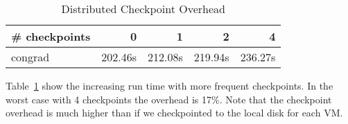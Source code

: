 \begin{table} [htb]
\begin{center}
\begin{tabular}{|l|r|r|r|r|}  \hline
\# checkpoints &      0  &       1 &   2    & 4 \\ \hline\hline
congrad        & 202.46s &  212.08s &  219.94s & 236.27s \\ \hline
\end{tabular}
\end{center}
\caption{Distributed Checkpoint Overhead}
\label{tab:dcheckpointoverhead}
\end{table}

Table~\ref{tab:dcheckpointoverhead} show the increasing run time with more frequent checkpoints.  In the worst case with 4 checkpoints the overhead is 17\%.  Note that the checkpoint overhead is much higher than if we checkpointed to the local disk for each VM.

